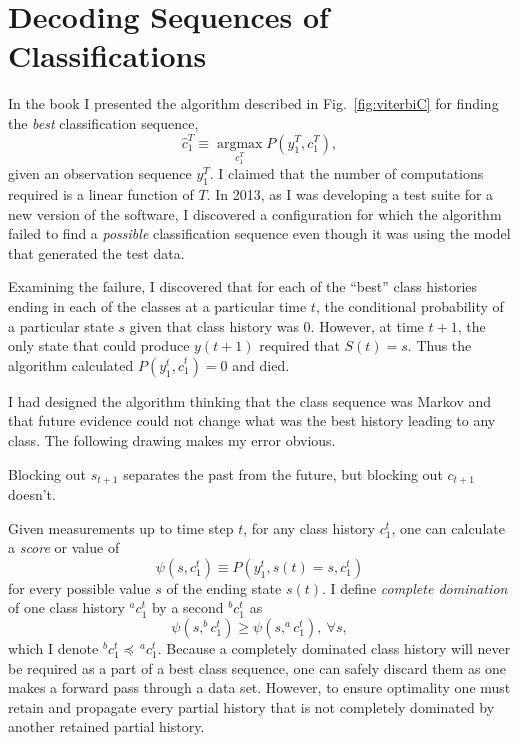 \documentclass[prelim,showlabels]{book}
\newcommand{\argmax}{\operatorname*{argmax}}
\begin{document}
\section{Decoding Sequences of Classifications}
\label{sec:V4Class}

In the book I presented the algorithm described in
Fig.~\ref{fig:viterbiC} for finding the \emph{best} classification
sequence,
\begin{equation*}
  \hat c_1^T \equiv \argmax_{c_1^T} P(y_1^T,c_1^T),
\end{equation*}
given an observation sequence $y_1^T$.  I claimed that the number of
computations required is a linear function of $T$.  In 2013, as I was
developing a test suite for a new version of the software, I
discovered a configuration for which the algorithm failed to find a
\emph{possible} classification sequence even though it was using the
model that generated the test data.

Examining the failure, I discovered that for each of the ``best''
class histories ending in each of the classes at a particular time
$t$, the conditional probability of a particular state $s$ given that
class history was 0.  However, at time $t+1$, the only state that
could produce $y(t+1)$ required that $S(t)=s$.  Thus the algorithm
calculated $P(y_1^{t}, \hat c_1^{t}) = 0$ and died.

I had designed the algorithm thinking that the class sequence was
Markov and that future evidence could not change what was the best
history leading to any class.  The following drawing makes my error
obvious.
\begin{center}
  \resizebox{0.75\columnwidth}{!}{}
\end{center}
Blocking out $s_{t+1}$ separates the past from the future, but
blocking out $c_{t+1}$ doesn't.

Given measurements up to time step $t$, for any class history $c_1^t$,
one can calculate a \emph{score} or value of
\begin{equation*}
  \psi(s,c_1^t) \equiv P(y_1^t, s(t) = s, c_1^t)
\end{equation*}
for every possible value $s$ of the ending state $s(t)$.  I define
\emph{complete domination} of one class history $^a c_1^t$ by a
second $^b c_1^t$ as
\begin{equation*}
  \psi(s, ^b \!c_1^t) \geq \psi(s, ^a\! c_1^t),~ \forall s,
\end{equation*}
which I denote $^b \! c_1^t \preceq \,^a\!c_1^t$.  Because a completely
dominated class history will never be required as a part of a best
class sequence, one can safely discard them as one makes a forward
pass through a data set.  However, to ensure optimality one must
retain and propagate every partial history that is not completely
dominated by another retained partial history.
\end{document}
